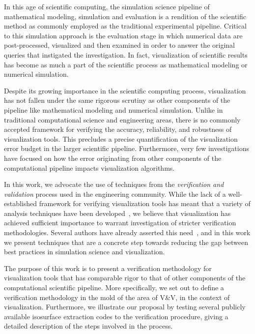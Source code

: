 In this age of scientific computing, 
the simulation science pipeline of mathematical
modeling, simulation and evaluation is
a rendition of the scientific method as commonly employed as
the traditional experimental pipeline.
Critical to this simulation approach is
the evaluation stage in which numerical
data are post-processed, visualized and 
then examined in order to answer the original
queries that instigated the investigation.
In fact, visualization of scientific results has become
as much a part of the scientific process as 
mathematical modeling or numerical simulation.  

Despite its growing importance in the
scientific computing process, visualization has not fallen under the same
rigorous scrutiny as other components of the pipeline
like mathematical modeling and numerical simulation.
Unlike in traditional computational science and engineering areas,
there is no commonly accepted framework for verifying the accuracy, reliability, 
and robustness of visualization tools. This precludes
a precise quantification of the visualization error budget in the 
larger scientific pipeline.
Furthermore, very few investigations have focused on how the error originating from 
other components of the computational pipeline
impacts visualization algorithms. %

In this work, we advocate the use of techniques from the
\emph{verification and validation} process used in the engineering
community. While
the lack of a well-established framework for verifying visualization
tools has meant that a variety of analysis techniques have been
developed~\cite{zhou01,tory04}, we believe that visualization 
has achieved sufficient importance to warrant investigation of
stricter verification methodologies. Several authors have
already asserted this need~\cite{globus95,kirby-vv-08}, and in this work we
present techniques that are a concrete step towards reducing the
gap between best practices in simulation science and visualization.


The purpose of this work is to present a verification methodology
for visualization tools that has comparable rigor to that of other 
components of the computational scientific pipeline. More specifically, we set out
to define a verification methodology in the mold of the area of V\&V, 
in the context of visualization.
Furthermore, we illustrate our proposal by testing several publicly 
available isosurface extraction
codes to the verification procedure, giving a detailed 
description of the steps involved in the process.

